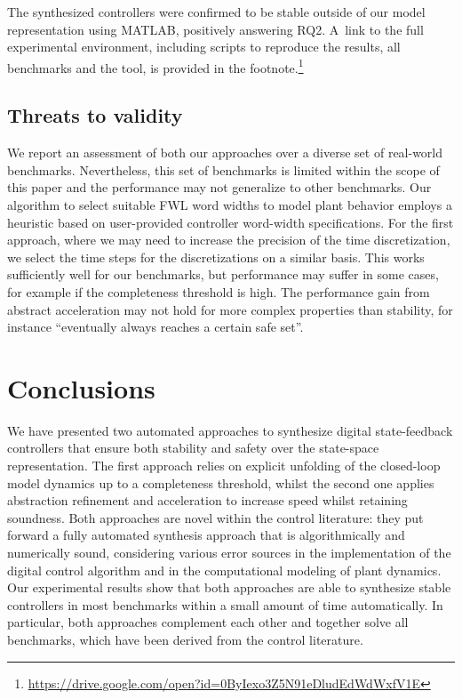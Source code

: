 \documentclass[runningheads,a4paper]{llncs}
\begin{document}
The synthesized controllers were confirmed to be stable outside of our model
representation using MATLAB, positively answering RQ2.  A~link to the full
experimental environment, including scripts to reproduce the results, all
benchmarks and the tool, is provided in the
footnote.\footnote{\url{https://drive.google.com/open?id=0ByIexo3Z5N91eDludEdWdWxfV1E}}


\subsection{Threats to validity}
We report an assessment of both our approaches over a diverse set of real-world benchmarks. Nevertheless, this set of benchmarks is limited within the scope of this paper and the performance may not generalize to other benchmarks. 
%
Our algorithm to select suitable FWL word widths to model plant behavior employs a heuristic based on user-provided controller word-width specifications. For the first approach, where we may need to increase the precision of the time discretization, we select the time steps for the discretizations on a similar basis. This works sufficiently well for our benchmarks, but performance may suffer in some cases, for example if the completeness threshold is high. 
%
The performance gain from abstract acceleration may not hold for more complex properties than stability, for instance ``eventually always reaches a certain safe set''. 





\section{Conclusions}

We have presented two automated approaches to synthesize digital state-feedback controllers 
that ensure both stability and safety over the state-space representation.
The first approach relies on explicit unfolding of the closed-loop model dynamics 
up to a completeness threshold, whilst the second one applies abstraction 
refinement and acceleration to increase speed whilst retaining soundness.
%
Both approaches are novel within the control literature: they put 
forward a fully automated synthesis approach that is algorithmically and
numerically sound, considering various error sources in the implementation 
of the digital control algorithm and in the computational modeling of plant dynamics. 
%
Our experimental results show that both approaches are able
to synthesize stable controllers in most benchmarks within a small 
amount of time automatically.  In particular, both approaches 
complement each other and together solve all benchmarks, which have been derived from the control literature.  
\end{document}
